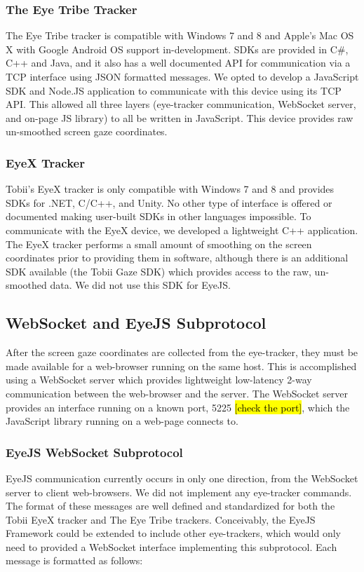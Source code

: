 \documentclass{sigchi}
\begin{document}
\subsubsection{The Eye Tribe Tracker}
The Eye Tribe tracker is compatible with Windows 7 and 8 and Apple's Mac OS X with Google Android OS support in-development. SDKs are provided in C\#, C++ and Java, and it also has a well documented API for communication via a TCP interface using JSON formatted messages. We opted to develop a JavaScript SDK and Node.JS application to communicate with this device using its TCP API. This allowed all three layers (eye-tracker communication, WebSocket server, and on-page JS library) to all be written in JavaScript. This device provides raw un-smoothed screen gaze coordinates.


\subsubsection{EyeX Tracker}
Tobii's EyeX tracker is only compatible with Windows 7 and 8 and provides SDKs for .NET, C/C++, and Unity. No other type of interface is offered or documented making user-built SDKs in other languages impossible. To communicate with the EyeX device, we developed a lightweight C++ application. The EyeX tracker performs a small amount of smoothing on the screen coordinates prior to providing them in software, although there is an additional SDK available (the Tobii Gaze SDK) which provides access to the raw, un-smoothed data. We did not use this SDK for EyeJS.


\subsection{WebSocket and EyeJS Subprotocol}
After the screen gaze coordinates are collected from the eye-tracker, they must be made available for a web-browser running on the same host. This is accomplished using a WebSocket server which provides lightweight low-latency 2-way communication between the web-browser and the server. The WebSocket server provides an interface running on a known port, 5225 \hl{[check the port]}, which the JavaScript library running on a web-page connects to.

\subsubsection{EyeJS WebSocket Subprotocol}
EyeJS communication currently occurs in only one direction, from the WebSocket server to client web-browsers. We did not implement any eye-tracker commands. The format of these messages are well defined and standardized for both the Tobii EyeX tracker and The Eye Tribe trackers. Conceivably, the EyeJS Framework could be extended to include other eye-trackers, which would only need to provided a WebSocket interface implementing this subprotocol. Each message is formatted as follows:
\end{document}
